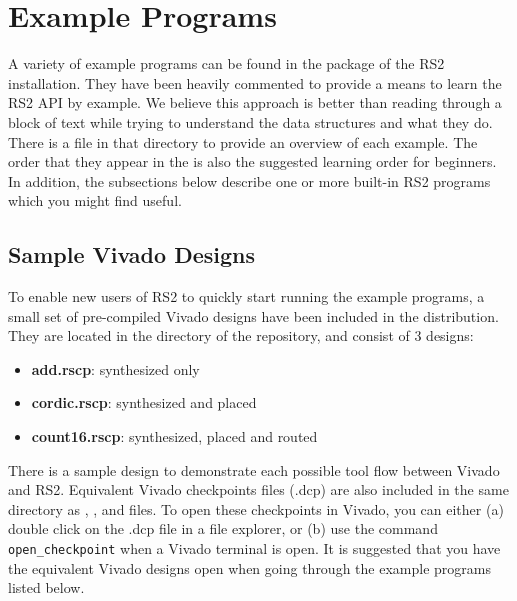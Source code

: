 \newpage
\section{Example Programs} \label{examples}

A variety of example programs can be found in the
 package of the RS2 installation.
They have been heavily commented to provide a means to learn the RS2 API by
example. We believe this approach is better than reading through a block of
text while trying to understand the data structures and what they do.
There is a  file in that directory to provide an overview of
each example. The order that they appear in the  is also the
suggested learning order for beginners. In addition, the subsections below
describe one or more built-in RS2 programs which you might find useful.

\subsection{Sample Vivado Designs}
To enable new users of RS2 to quickly start running the example
programs, a small set of pre-compiled Vivado designs have been included in the
distribution. They are located in the  directory of
the repository, and consist of 3 designs: 
\begin{itemize}
\item \textbf{add.rscp}: synthesized only
\item \textbf{cordic.rscp}: synthesized and placed
\item \textbf{count16.rscp}: synthesized, placed and routed
\end{itemize} 
There is a sample design to demonstrate each possible tool flow between Vivado
and RS2. Equivalent Vivado checkpoints files (.dcp) are also included in
the same directory as , , and 
files. To open these checkpoints in Vivado, you can either (a) double click on
the .dcp file in a file explorer, or (b) use the command
\texttt{open\_checkpoint} when a Vivado terminal is open. It is suggested that
you have the equivalent Vivado designs open when going through the example
programs listed below.

